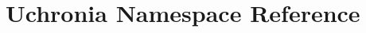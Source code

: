 \hypertarget{namespace_uchronia}{\section{Uchronia Namespace Reference}
\label{namespace_uchronia}
}
